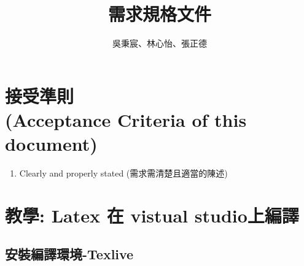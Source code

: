 \documentclass[12pt]{article}
\begin{document}
\begin{CJK*}{UTF8}{bsmi}

    \title{需求規格文件}
    \author{吳秉宸、林心怡、張正德}
    \maketitle
    \newpage

    \section{接受準則\\(Acceptance Criteria of this document)}

    \begin{enumerate}
        \item  Clearly and properly stated (需求需清楚且適當的陳述)
    \end{enumerate}

    \section{教學: Latex 在 vistual studio上編譯}

    \subsection{安裝編譯環境-Texlive}
    \subsubsection{}

\end{CJK*}
\end{document}
